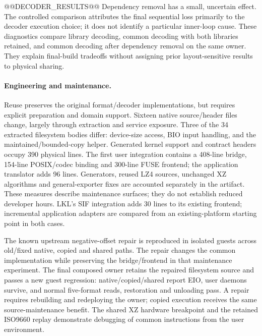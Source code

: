 @@DECODER_RESULTS@@
Dependency removal has a small, uncertain effect. The controlled
comparison attributes the final sequential loss primarily to the decoder
execution choice; it does not identify a particular inner-loop cause.
These diagnostics compare library decoding, common decoding with both
libraries retained, and common decoding after dependency removal on the
same owner. They explain final-build tradeoffs without assigning prior
layout-sensitive results to physical sharing.

\paragraph{Engineering and maintenance.}
Reuse preserves the original format/decoder implementations, but requires
explicit preparation and domain support. Sixteen native source/header files
change, largely through extraction and service exposure. Three of the
34 extracted filesystem bodies differ: device-size access, BIO input
handling, and the maintained/bounded-copy helper. Generated kernel support
and contract headers occupy 390 physical lines. The first user integration
contains a 408-line bridge, 154-line POSIX/codec binding and 300-line FUSE
frontend; the application translator adds 96 lines. Generators, reused LZ4
sources, unchanged XZ algorithms and general-exporter fixes are accounted
separately in the artifact. These measures describe maintenance surfaces;
they do not establish reduced developer hours. LKL's SIF integration adds
30 lines to its existing frontend; incremental application adapters are
compared from an existing-platform starting point in both cases.

The known upstream negative-offset repair is reproduced in isolated guests
across old/fixed native, copied and shared paths. The repair changes the
common implementation while preserving the bridge/frontend in that
maintenance experiment. The final composed owner retains the repaired
filesystem source and passes a new guest regression: native/copied/shared
report EIO, user daemons survive, and normal five-format reads, restoration
and unloading pass. A repair requires rebuilding and redeploying the owner;
copied execution receives the same source-maintenance benefit. The shared
XZ hardware breakpoint and the retained ISO9660 replay demonstrate debugging
of common instructions from the user environment.


